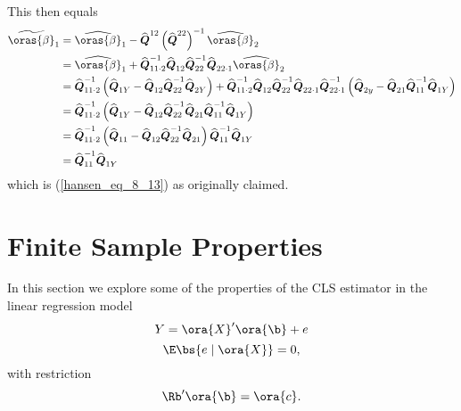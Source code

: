 This then equals 
\begin{equation}
    \notag
    \begin{aligned}
        \widetilde{{\oras{\beta}}}_1 & =\widehat{\oras{\beta}}_1-\widehat{\boldsymbol{Q}}^{12}\left(\widehat{\boldsymbol{Q}}^{22}\right)^{-1} \widehat{\oras{\beta}}_2 \\
        & =\widehat{\oras{\beta}}_1+\widehat{\boldsymbol{Q}}_{11 \cdot 2}^{-1} \widehat{\boldsymbol{Q}}_{12} \widehat{\boldsymbol{Q}}_{22}^{-1} \widehat{\boldsymbol{Q}}_{22 \cdot 1} \widehat{\oras{\beta}}_2 \\
        & =\widehat{\boldsymbol{Q}}_{11 \cdot 2}^{-1}\left(\widehat{\boldsymbol{Q}}_{1 Y}-\widehat{\boldsymbol{Q}}_{12} \widehat{\boldsymbol{Q}}_{22}^{-1} \widehat{\boldsymbol{Q}}_{2 Y}\right) +\widehat{\boldsymbol{Q}}_{11 \cdot 2}^{-1} \widehat{\boldsymbol{Q}}_{12} \widehat{\boldsymbol{Q}}_{22}^{-1} \widehat{\boldsymbol{Q}}_{22 \cdot 1} \widehat{\boldsymbol{Q}}_{22 \cdot 1}^{-1}\left(\widehat{\boldsymbol{Q}}_{2 y}-\widehat{\boldsymbol{Q}}_{21} \widehat{\boldsymbol{Q}}_{11}^{-1} \widehat{\boldsymbol{Q}}_{1 Y}\right) \\
        & =\widehat{\boldsymbol{Q}}_{11 \cdot 2}^{-1}\left(\widehat{\boldsymbol{Q}}_{1 Y}-\widehat{\boldsymbol{Q}}_{12} \widehat{\boldsymbol{Q}}_{22}^{-1} \widehat{\boldsymbol{Q}}_{21} \widehat{\boldsymbol{Q}}_{11}^{-1} \widehat{\boldsymbol{Q}}_{1 Y}\right) \\
        & =\widehat{\boldsymbol{Q}}_{11 \cdot 2}^{-1}\left(\widehat{\boldsymbol{Q}}_{11}-\widehat{\boldsymbol{Q}}_{12} \widehat{\boldsymbol{Q}}_{22}^{-1} \widehat{\boldsymbol{Q}}_{21}\right) \widehat{\boldsymbol{Q}}_{11}^{-1} \widehat{\boldsymbol{Q}}_{1 Y} \\
        & =\widehat{\boldsymbol{Q}}_{11}^{-1} \widehat{\boldsymbol{Q}}_{1 Y}
    \end{aligned}
\end{equation}
which is (\ref{hansen_eq_8_13}) as originally claimed.


\section{Finite Sample Properties}

In this section we explore some of the properties of the CLS estimator in the linear regression model
\begin{equation}
    \label{hansen_eq_8_14}
    Y = \ora{X}^\prime \ora{\b} + e
\end{equation}
\begin{equation}
    \label{hansen_eq_8_15}
    \E \bs{e \mid \ora{X}} = 0,
\end{equation}
with restriction 
\begin{equation}
    \notag 
    \Rb^{\prime}\ora{\b} = \ora{c}.
\end{equation}

